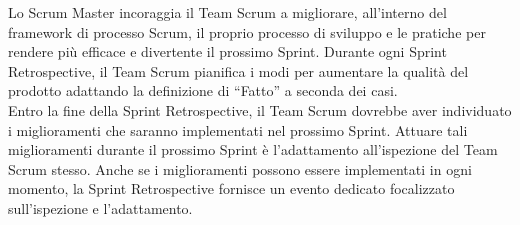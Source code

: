 \noindent Lo Scrum Master incoraggia il Team Scrum a migliorare, all'interno del framework di processo Scrum, il proprio processo di 
sviluppo e le pratiche per rendere pi\`u efficace e divertente il prossimo Sprint. Durante ogni Sprint Retrospective, il Team Scrum 
pianifica i modi per aumentare la qualit\`a del prodotto adattando la definizione di ``Fatto'' a seconda dei casi. \newline
\\Entro la fine della Sprint Retrospective, il Team Scrum dovrebbe aver individuato i miglioramenti che saranno implementati nel prossimo 
Sprint. Attuare tali miglioramenti durante il prossimo Sprint \`e l'adattamento all'ispezione del Team Scrum stesso. Anche se i 
miglioramenti possono essere implementati in ogni momento, la Sprint Retrospective fornisce un evento dedicato focalizzato sull'ispezione e 
l'adattamento.
